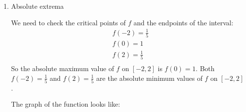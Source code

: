 \documentclass[nooutcomes]{ximera}
\begin{document}
\begin{problem}
\begin{enumerate}
	\item  Absolute extrema
	
		\begin{freeResponse}
		We need to check the critical points of $f$ and the endpoints of the interval:
		\begin{align*}
  		& f(-2)=\frac{1}{5} \\ 
 		& f(0)=1 \\ 
 		& f(2)=\frac{1}{5} \\ 
		\end{align*}
		So the absolute maximum value of $f$ on $[-2,2]$ is $f(0)=1$.  Both $f(-2)=\frac{1}{5}$ and $f(2)=\frac{1}{5}$ are the absolute minimum values of $f$ on $[-2,2]$.
		
		The graph of the function looks like:
		
\begin{center}
\begin{image}
\end{image}
\end{center}


		\end{freeResponse}
	
	\end{enumerate}
		
\end{problem}
\end{document}
